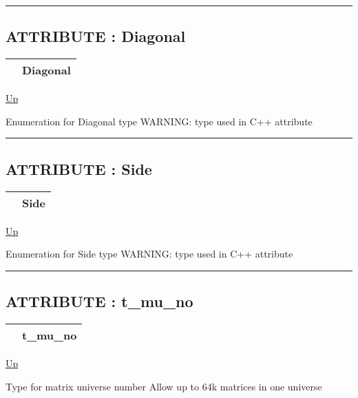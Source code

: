 \rule{\textwidth}{0.4pt}
\subsection*{ATTRIBUTE : Diagonal}
\hypertarget{ecldoc:ecldoc-Diagonal}{}

{\renewcommand{\arraystretch}{1.5}
\begin{tabularx}{\textwidth}{|>{\raggedright\arraybackslash}l|X|}
\hline
\hspace{0pt} & Diagonal \\
\hline
\end{tabularx}
}

\hyperlink{ecldoc:PBblas.Types}{Up}

\par
Enumeration for Diagonal type WARNING: type used in C++ attribute


\rule{\textwidth}{0.4pt}
\subsection*{ATTRIBUTE : Side}
\hypertarget{ecldoc:ecldoc-Side}{}

{\renewcommand{\arraystretch}{1.5}
\begin{tabularx}{\textwidth}{|>{\raggedright\arraybackslash}l|X|}
\hline
\hspace{0pt} & Side \\
\hline
\end{tabularx}
}

\hyperlink{ecldoc:PBblas.Types}{Up}

\par
Enumeration for Side type WARNING: type used in C++ attribute


\rule{\textwidth}{0.4pt}
\subsection*{ATTRIBUTE : t\_mu\_no}
\hypertarget{ecldoc:pbblas.types.t_mu_no}{}

{\renewcommand{\arraystretch}{1.5}
\begin{tabularx}{\textwidth}{|>{\raggedright\arraybackslash}l|X|}
\hline
\hspace{0pt} & t\_mu\_no \\
\hline
\end{tabularx}
}

\hyperlink{ecldoc:PBblas.Types}{Up}

\par
Type for matrix universe number Allow up to 64k matrices in one universe


